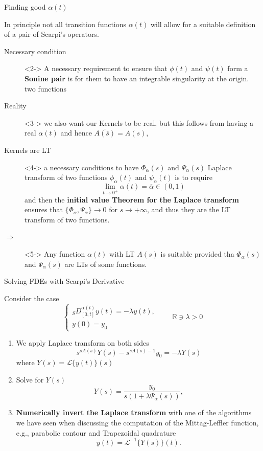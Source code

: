 \documentclass[aspectratio=169,xcolor=dvipsnames]{beamer}
\begin{document}
\begin{frame}{Finding good $\alpha(t)$~{\Large\parencite{MR4268683}}}

In principle not all transition functions $\alpha(t)$ will allow for a suitable definition of a pair of Scarpi's operators.

\begin{description}
\item[Necessary condition]<2-> A necessary requirement to ensure that $\phi(t)$ and $\psi(t)$ form a \textbf{Sonine pair} is for them to have an
integrable singularity at the origin. 
two functions 
\item[Reality]<3-> we also want our Kernels to be real, but this follows from having a real $\alpha(t)$ and hence $\overline{A(\overline{s})} = A(s)$,
\item[Kernels are LT]<4-> a necessary conditions to have $\Phi_\alpha(s)$ and $\Psi_\alpha(s)$ Laplace transform of two functions $\phi_\alpha(t)$ and $\psi_\alpha(t)$ is to require
\[
\lim_{t \rightarrow 0^+} \alpha(t) = \overline{\alpha} \in (0,1)
\]
and then the \textbf{initial value Theorem for the Laplace transform} ensures that $\{\Phi_\alpha,\Psi_\alpha\} \rightarrow 0$ for $s \rightarrow +\infty$, and thus they are the LT transform of two functions.
\item[$\Rightarrow$]<5-> Any function $\alpha(t)$ with LT $A(s)$ is suitable provided tha $\Phi_\alpha(s)$ and $\Psi_\alpha(s)$ are LTs of some functions.
\end{description}

\end{frame}

\begin{frame}{Solving FDEs with Scarpi's Derivative}

Consider the case
\[
\begin{cases}
{}_{S}D^{\alpha(t)}_{[0,t]} y(t) = -\lambda y(t), \\
y(0) = y_0
\end{cases} \qquad \mathbb{R} \ni \lambda > 0
\]
\begin{enumerate}
\item<2-> We apply Laplace transform on both sides
\[
s^{sA(s)} Y(s) - s^{s A(s) - 1} y_0 = -\lambda Y(s)
\]
where $Y(s) = \mathcal{L}\{y(t)\}(s)$
\item<3-> Solve for $Y(s)$
\[
Y(s) = \frac{y_0}{s(1 + \lambda \Psi_\alpha(s))},
\]
\item<4-> \textbf{Numerically invert the Laplace transform} with one of the algorithms we have seen when discussing the computation of the Mittag-Leffler function, e.g., parabolic contour and Trapezoidal quadrature
\[
y(t) = \mathcal{L}^{-1}\{Y(s)\}(t).
\]
\end{enumerate}
\end{frame}
\end{document}
